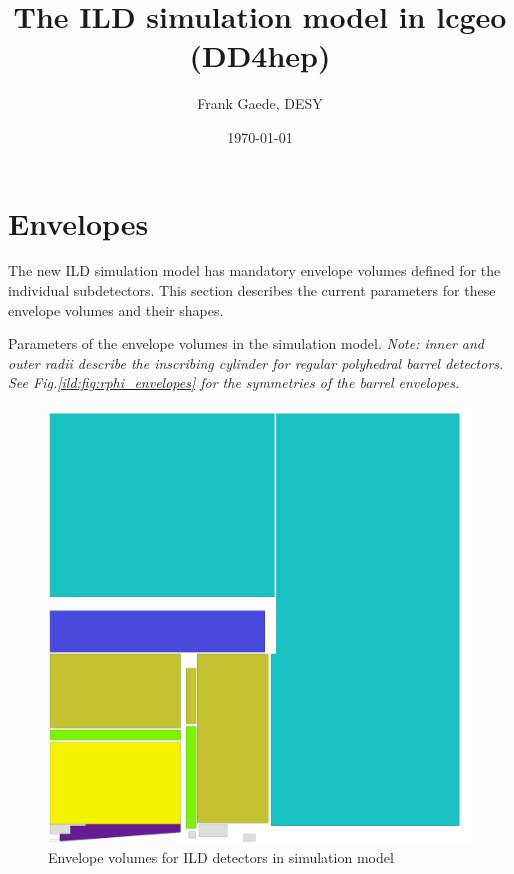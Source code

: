 \documentclass[a4paper]{article}
\title{The ILD simulation model in lcgeo (DD4hep) }
\author{Frank Gaede, DESY \\ %
}
\date{\today}
\begin{document}
\maketitle

\section{Envelopes}
The new ILD simulation model has mandatory envelope volumes defined for the individual subdetectors.
This section describes the current parameters for these envelope volumes and their shapes.


{\small
  \begin{table}
    
    \caption{Parameters of the envelope volumes in the simulation model. 
      \em{Note: inner and outer radii describe the inscribing cylinder for regular polyhedral barrel detectors.}
      See Fig.\ref{ild:fig:rphi_envelopes} for the symmetries of the barrel envelopes.
    }

  \end{table}
}

\begin{figure}[th]
  \centering
  \includegraphics[width=\columnwidth]{ILD_rz_quadrant}
  \caption{Envelope volumes for ILD detectors in simulation model}
  \label{ild:fig:rz_envelopes}
\end{figure}
\end{document}
